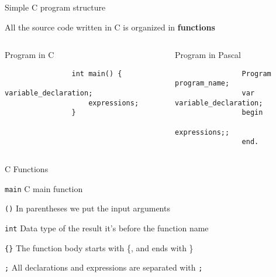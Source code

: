 \begin{frame}[fragile]{Simple C program structure}

    All the source code written in C is organized in \textbf{functions}
    \linebreak
    
    \begin{columns}[t]
            \begin{block}{Program in C}
                \begin{lstlisting}
                int main() {
                    variable_declaration;
                    expressions;                    
                }
                \end{lstlisting}
            \end{block}
            \begin{block}{Program in Pascal}
                \begin{lstlisting}
                Program program_name;
                var variable_declaration;
                begin
                    expressions;;
                end.
                \end{lstlisting}
            \end{block}
    \end{columns}

\end{frame}

\begin{frame}[shrink=10]{C Functions}
    \hfill
    \begin{block}{\texttt{main}}
         C main function
    \end{block}
    
    \begin{block}{\texttt{()}}
         In parentheses we put the input arguments
    \end{block}
    
    \begin{block}{\texttt{int}}
         Data type of the result it's before the function name
    \end{block}
    
    \begin{block}{\texttt{\{\}}}
         The function body starts with \{, and ends with \}
    \end{block}

    \begin{block}{\texttt{;}}
    All declarations and expressions are separated with \texttt{;}
    \end{block}

\end{frame}


